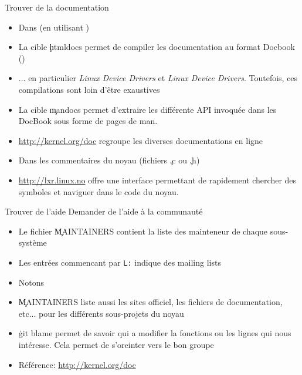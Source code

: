 \begin{frame}[fragile=singleslide]{Trouver de la documentation}
  \begin{itemize} 
  \item Dans  (en utilisant )
  \item La cible \c{htmldocs}  permet de compiler les documentation au
    format Docbook ()
  \item ... en particulier  \emph{Linux Device Drivers} et \emph{Linux
      Device  Drivers}. Toutefois, ces  compilations sont  loin d'être
    exaustives
  \item  La cible  \c{mandocs}  permet d'extraire  les différente  API
    invoquée dans les DocBook sous forme de pages de man.
  \item    \url{http://kernel.org/doc}     regroupe    les    diverses
    documentations en ligne
  \item Dans les commentaires du noyau (fichiers \c{.c} ou \c{.h})
  \item  \url{http://lxr.linux.no} offre  une interface  permettant de
    rapidement  chercher des  symboles  et naviguer  dans  le code  du
    noyau.
  \end{itemize}
\end{frame}

\begin{frame}[fragile=singleslide]{Trouver de l'aide}
  Demander de l'aide à la communauté
  \begin{itemize}
  \item Le fichier \c{MAINTAINERS} contient la liste des mainteneur de
    chaque sous-système
  \item  Les entrées  commencant par  \texttt{L:} indique  des mailing
    lists
  \item Notons 
  \item \c{MAINTAINERS}  liste aussi les sites  officiel, les fichiers
    de  documentation,  etc...  pour  les  différents sous-projets  du
    noyau
  \item \c{git blame} permet de  savoir qui a modifier la fonctions ou
    les lignes qui  nous intéresse. Cela permet de  s'oreinter vers le
    bon groupe
  \item Référence: \url{http://kernel.org/doc}
  \end{itemize}
\end{frame} 

